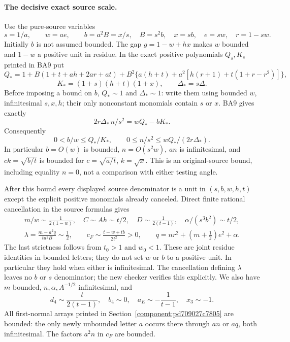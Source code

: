 \paragraph{The decisive exact source scale.}
Use the pure-source variables
\[
 s=1/a,\qquad w=ae,\qquad b=a^2B=x/s,
 \quad B=s^2b,\quad x=sb,\quad e=sw,\quad r=1-sw.
\]
Initially $b$ is not assumed bounded. The gap $g=1-w+hx$ makes $w$
bounded and $1-w$ a positive unit in residue. In the exact positive
polynomials $Q_s,K_s$ printed in BA9 put
\[
 Q_*=1+B(1+t+ah+2ar+at)
 +B^2\{a(h+t)+a^2[h(r+1)+t(1+r-r^2)]\},
\]
\[
 K_*=(1+s)(h+t)(1+x),\qquad \Delta_*=s\Delta.
\]
Before imposing a bound on $b$, $Q_*\sim1$ and $\Delta_*\sim1$:
write them using bounded $w$, infinitesimal $s,x,h$; their only
nonconstant monomials contain $s$ or $x$. BA9 gives exactly
\[
 \boxed{\quad 2r\Delta_*\,n/s^2=wQ_*-bK_* .\quad}
\tag{R10.2}
\]
Consequently
\[
 0<b/w\le Q_*/K_*,\qquad
 0\le n/s^2\le wQ_*/(2r\Delta_*).
\tag{R10.3}
\]
In particular $b=O(w)$ is bounded, $n=O(s^2w)$, $an$ is
infinitesimal, and $ck=\sqrt{b/t}$ is bounded for
$c=\sqrt{a/t}$, $k=\sqrt{x}$. This is an original-source bound,
including equality $n=0$, not a comparison with either testing angle.

After this bound every displayed source denominator is a unit in
$(s,b,w,h,t)$ except the explicit positive monomials already canceled.
Direct finite rational cancellation in the source formulas gives
\[
 \begin{gathered}
 m/w\sim\frac1{2(1-w)},\quad
 C\sim Ah\sim t/2,\quad D\sim\frac1{2(t-1)},\quad
 \alpha/(s^3b^2)\sim t/2,\\
 \lambda=\frac{m-a^2q}{ta^2B}\sim\frac12,\qquad
 c_F\sim\frac{t-w+tb}{2t^2}>0,\qquad
 q=nr^2+(m+\tfrac12)e^2+\alpha.
 \end{gathered}
\tag{R10.4}
\]
The last strictness follows from $t_0>1$ and $w_0<1$.
These are joint residue identities in bounded letters; they do not
set $w$ or $b$ to a positive unit. In particular they hold when either
is infinitesimal. The cancellation defining $\lambda$ leaves no $b$
or $s$ denominator; the new checker verifies this explicitly.
We also have $m$ bounded, $n,\alpha,A^{-1/2}$ infinitesimal, and
\[
 d_4\sim\frac{t}{2(t-1)},\quad b_4\sim0,\quad
 a_E\sim-\frac1{t-1},\quad x_3\sim-1.
\tag{R10.5}
\]
All first-normal arrays printed in
Section~\ref{component:pd709027c7805} are bounded:
the only newly unbounded letter $a$ occurs there through $an$ or
$aq$, both infinitesimal. The factors $a^2n$ in $c_F$ are bounded.

